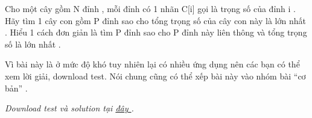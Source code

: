 Cho một cây gồm N đỉnh , mỗi đỉnh có 1 nhãn C[i] gọi là trọng số của đỉnh i . Hãy tìm 1 cây con gồm P đỉnh sao cho tổng trọng số của cây con này là lớn nhất . Hiểu 1 cách đơn giản là tìm P đỉnh sao cho P đỉnh này liên thông và tổng trọng số là lớn nhất .   





       Vì bài này là ở mức độ khó tuy nhiên lại có nhiều ứng dụng nên các bạn có thể xem lời giải, download test. Nói chung cũng có thể xếp bài này vào nhóm bài “cơ bản” .      





\textit{    Download test và solution tại    \href{http://vn.spoj.pl/content/ptree.rar}{     đây    }    .   }